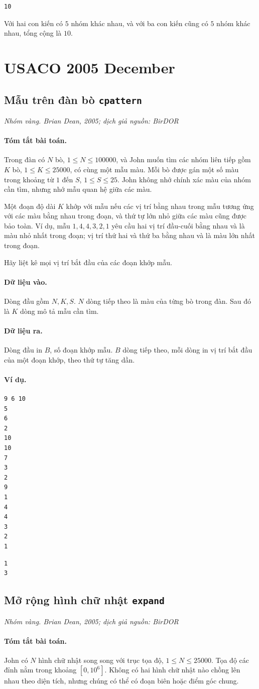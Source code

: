 \documentclass[11pt]{article}
\newcommand{\problem}[4]{%
  \subsection[#1 (#2)]{#1 \hfill {\normalsize\texttt{#2}}}%
  \noindent\textit{#3. #4}\par\smallskip
}
\newcommand{\iosec}[1]{\paragraph{#1}}
\begin{document}
\begin{verbatim}
10
\end{verbatim}

Với hai con kiến có \(5\) nhóm khác nhau, và với ba con kiến cũng có \(5\)
nhóm khác nhau, tổng cộng là \(10\).

\section{USACO 2005 December}

\problem{Mẫu trên đàn bò}{cpattern}{Nhóm vàng}{Brian Dean, 2005; dịch giả nguồn: BirDOR}

\iosec{Tóm tắt bài toán.}
Trong đàn có \(N\) bò, \(1\le N\le 100000\), và John muốn tìm các nhóm liên
tiếp gồm \(K\) bò, \(1\le K\le 25000\), có cùng một mẫu màu. Mỗi bò được gán
một số màu trong khoảng từ \(1\) đến \(S\), \(1\le S\le 25\). John không nhớ
chính xác màu của nhóm cần tìm, nhưng nhớ mẫu quan hệ giữa các màu.

Một đoạn độ dài \(K\) khớp với mẫu nếu các vị trí bằng nhau trong mẫu tương
ứng với các màu bằng nhau trong đoạn, và thứ tự lớn nhỏ giữa các màu cũng
được bảo toàn. Ví dụ, mẫu \(1,4,4,3,2,1\) yêu cầu hai vị trí đầu-cuối bằng
nhau và là màu nhỏ nhất trong đoạn; vị trí thứ hai và thứ ba bằng nhau và là
màu lớn nhất trong đoạn.

Hãy liệt kê mọi vị trí bắt đầu của các đoạn khớp mẫu.

\iosec{Dữ liệu vào.}
Dòng đầu gồm \(N,K,S\). \(N\) dòng tiếp theo là màu của từng bò trong đàn.
Sau đó là \(K\) dòng mô tả mẫu cần tìm.

\iosec{Dữ liệu ra.}
Dòng đầu in \(B\), số đoạn khớp mẫu. \(B\) dòng tiếp theo, mỗi dòng in vị trí
bắt đầu của một đoạn khớp, theo thứ tự tăng dần.

\iosec{Ví dụ.}
\begin{verbatim}
9 6 10
5
6
2
10
10
7
3
2
9
1
4
4
3
2
1
\end{verbatim}

\begin{verbatim}
1
3
\end{verbatim}

\problem{Mở rộng hình chữ nhật}{expand}{Nhóm vàng}{Brian Dean, 2005; dịch giả nguồn: BirDOR}

\iosec{Tóm tắt bài toán.}
John có \(N\) hình chữ nhật song song với trục tọa độ,
\(1\le N\le 25000\). Tọa độ các đỉnh nằm trong khoảng \([0,10^6]\). Không có
hai hình chữ nhật nào chồng lên nhau theo diện tích, nhưng chúng có thể có
đoạn biên hoặc điểm góc chung.
\end{document}
